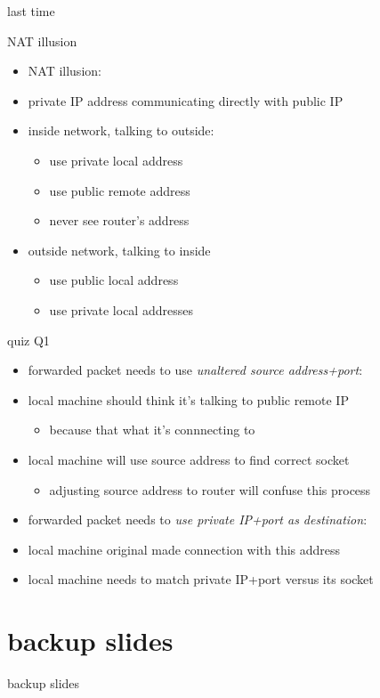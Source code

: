 \date{}
\title{}
\date{}

\begin{frame}
    \titlepage
\end{frame}

\begin{frame}{last time}
\end{frame}

\begin{frame}{NAT illusion}
    \begin{itemize}
    \item NAT illusion:
    \item private IP address communicating directly with public IP
    \vspace{.5cm}
    \item inside network, talking to outside:
        \begin{itemize}
        \item use private local address
        \item use public remote address
        \item never see router's address
        \end{itemize}
    \item outside network, talking to inside
        \begin{itemize}
        \item use public local address
        \item use private local addresses
        \end{itemize}
    \end{itemize}
\end{frame}

\begin{frame}{quiz Q1}
    \begin{itemize}
    \item forwarded packet needs to use \textit{unaltered source address+port}:
    \item local machine should think it's talking to public remote IP
        \begin{itemize}
        \item because that what it's connnecting to
        \end{itemize}
    \item local machine will use source address to find correct socket
        \begin{itemize}
        \item adjusting source address to router will confuse this process
        \end{itemize}
    \vspace{.5cm}
    \item forwarded packet needs to \textit{use private IP+port as destination}:
    \item local machine original made connection with this address
    \item local machine needs to match private IP+port versus its socket
    \end{itemize}
\end{frame}

\section{backup slides}
\begin{frame}{backup slides}
\end{frame}


